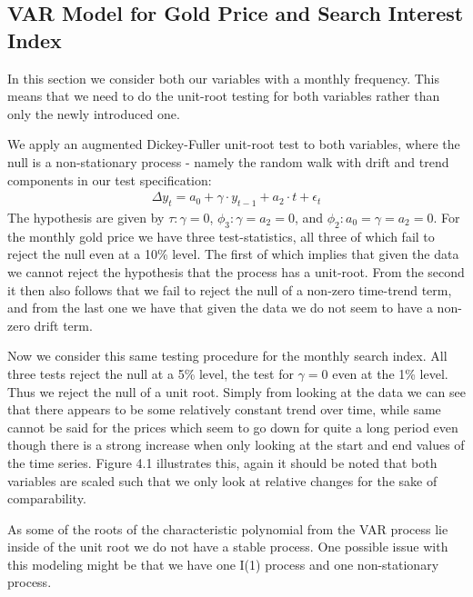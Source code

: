 \documentclass[a4paper]{article}
\theoremstyle{definition}
\begin{document}
\subsection{VAR Model for Gold Price and Search Interest Index}
In this section we consider both our variables with a monthly frequency. This means that we need to do the unit-root testing for both variables rather than only the newly introduced one. 

We apply an augmented Dickey-Fuller unit-root test to both variables, where the null is a non-stationary process - namely the random walk with drift and trend components in our test specification:
	\begin{align*}
	 \Delta y_t = a_0 + \gamma \cdot y_{t-1} + a_2 \cdot t + \epsilon_{t}
	\end{align*}
The hypothesis are given by $\tau: \gamma = 0$, $\phi_3: \gamma = a_2 = 0$, and $\phi_2: a_0 = \gamma = a_2 = 0$. For the monthly gold price we have three test-statistics, all three of which fail to reject the null even at a 10\% level. The first of which implies that given the data we cannot reject the hypothesis that the process has a unit-root. From the second it then also follows that we fail to reject the null of a non-zero time-trend term, and from the last one we have that given the data we do not seem to have a non-zero drift term.

Now we consider this same testing procedure for the monthly search index. All three tests reject the null at a 5\% level, the test for $\gamma = 0$ even at the 1\% level. Thus we reject the null of a unit root. Simply from looking at the data we can see that there appears to be some relatively constant trend over time, while same cannot be said for the prices which seem to go down for quite a long period even though there is a strong increase when only looking at the start and end values of the time series. Figure 4.1 illustrates this, again it should be noted that both variables are scaled such that we only look at relative changes for the sake of comparability.



As some of the roots of the characteristic polynomial from the VAR process lie inside of the unit root we do not have a stable process. One possible issue with this modeling might be that we have one I(1) process and one non-stationary process. 

\newpage
\end{document}
